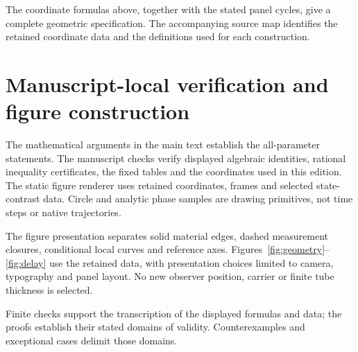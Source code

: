 The coordinate formulas above, together with the stated panel cycles, give a complete geometric specification. The accompanying source map identifies the retained coordinate data and the definitions used for each construction.

\section{Manuscript-local verification and figure construction}\label{app:checks}
The mathematical arguments in the main text establish the all-parameter statements. The manuscript checks verify displayed algebraic identities, rational inequality certificates, the fixed tables and the coordinates used in this edition. The static figure renderer uses retained coordinates, frames and selected state-contrast data. Circle and analytic phase samples are drawing primitives, not time steps or native trajectories.

The figure presentation separates solid material edges, dashed measurement closures, conditional local curves and reference axes. Figures~\ref{fig:geometry}--\ref{fig:delay} use the retained data, with presentation choices limited to camera, typography and panel layout. No new observer position, carrier or finite tube thickness is selected.

Finite checks support the transcription of the displayed formulas and data; the proofs establish their stated domains of validity. Counterexamples and exceptional cases delimit those domains.
